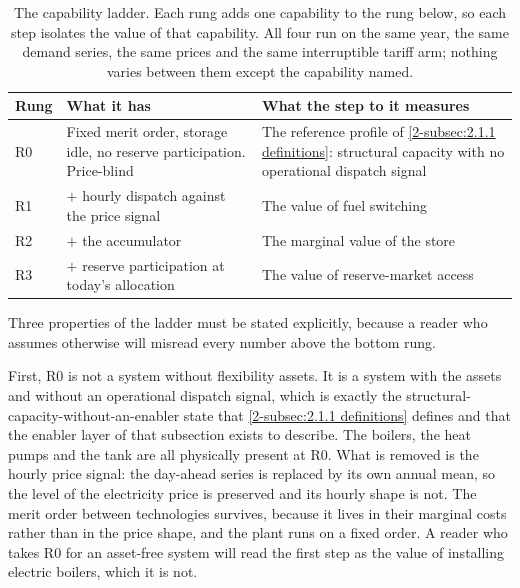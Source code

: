 \begin{table}[h]
\centering
\caption{The capability ladder. Each rung adds one capability to the rung below, so each step isolates the value of that capability. All four run on the same year, the same demand series, the same prices and the same interruptible tariff arm; nothing varies between them except the capability named.}
\small
\begin{tabular}{p{1.2cm} p{5.6cm} p{7.4cm}}
\toprule
\textbf{Rung} & \textbf{What it has} & \textbf{What the step to it measures} \\
\midrule
R0 & Fixed merit order, storage idle, no reserve participation. Price-blind & The reference profile of \autoref{2-subsec:2.1.1 definitions}: structural capacity with no operational dispatch signal \\
R1 & $+$ hourly dispatch against the price signal & The value of fuel switching \\
R2 & $+$ the accumulator & The marginal value of the store \\
R3 & $+$ reserve participation at today's allocation & The value of reserve-market access \\
\bottomrule
\end{tabular}
\label{tab:3.5.1 ladder}
\end{table}

Three properties of the ladder must be stated explicitly, because a reader who assumes otherwise will misread every number above the bottom rung.

First, R0 is not a system without flexibility assets. It is a system with the assets and without an operational dispatch signal, which is exactly the structural-capacity-without-an-enabler state that \autoref{2-subsec:2.1.1 definitions} defines and that the enabler layer of that subsection exists to describe. The boilers, the heat pumps and the tank are all physically present at R0. What is removed is the hourly price signal: the day-ahead series is replaced by its own annual mean, so the level of the electricity price is preserved and its hourly shape is not. The merit order between technologies survives, because it lives in their marginal costs rather than in the price shape, and the plant runs on a fixed order. A reader who takes R0 for an asset-free system will read the first step as the value of installing electric boilers, which it is not.


